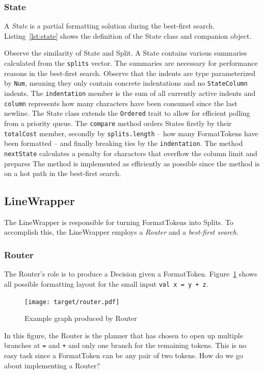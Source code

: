 \subsubsection{State}
A \emph{State} is a partial formatting solution during the best-first search.
Listing~\ref{lst:state} shows the definition of the State class and companion object.
\begin{minipage}{\linewidth}
  
\end{minipage}
Observe the similarity of State and Split.
A State contains various summaries calculated from the \texttt{splits} vector.
The summaries are necessary for performance reasons in the best-first search.
Observe that the indents are type parameterized by \texttt{Num}, meaning they only contain concrete indentations and no \texttt{StateColumn} indents.
The \texttt{indentation} member is the sum of all currently active indents and \texttt{column} represents how many characters have been consumed since the last newline.
The State class extends the \texttt{Ordered} trait to allow for efficient polling from a priority queue.
The \texttt{compare} method orders States firstly by their \texttt{totalCost} member, secondly by \texttt{splits.length} -- how many FormatTokens have been formatted -- and finally breaking ties by the \texttt{indentation}.
The method \texttt{nextState} calculates a penalty for characters that overflow the column limit and prepares
The method is implemented as efficiently as possible since the method is on a hot path in the best-first search.

\subsection{LineWrapper}
The LineWrapper is responsible for turning FormatTokens into Splits.
To accomplish this, the LineWrapper employs a \emph{Router} and a \emph{best-first search}.

\subsubsection{Router}\label{sec:router}
The Router's role is to produce a Decision given a FormatToken.
Figure~\ref{fig:router} shows all possible formatting layout for the small input \texttt{val x = y + z}.
\begin{figure}
  \centering
  \texttt{[image: target/router.pdf]}
  \caption{Example graph produced by Router}
  \label{fig:router}
\end{figure}
In this figure, the Router is the planner that has chosen to open up multiple branches at \texttt{=} and \texttt{+} and only one branch for the remaining tokens.
This is no easy task since a FormatToken can be any pair of two tokens.
How do we go about implementing a Router?

